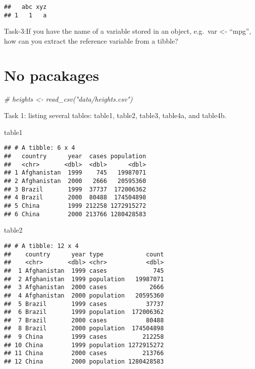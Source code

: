\documentclass[
]{article}
\newenvironment{Shaded}{\begin{snugshade}}{\end{snugshade}}
\newcommand{\CommentTok}[1]{\textcolor[rgb]{0.56,0.35,0.01}{\textit{#1}}}
\newcommand{\NormalTok}[1]{#1}
\begin{document}
\begin{verbatim}
##   abc xyz
## 1   1   a
\end{verbatim}

Task-3:If you have the name of a variable stored in an object, e.g.~var
\textless- ``mpg'', how can you extract the reference variable from a
tibble?

\hypertarget{no-pacakages}{%
\section{No pacakages}\label{no-pacakages}}

\begin{Shaded}
\begin{Highlighting}[]
\CommentTok{\# heights \textless{}{-} read\_csv("data/heights.csv")}
\end{Highlighting}
\end{Shaded}

Task 1: listing several tables: table1, table2, table3, table4a, and
table4b.

\begin{Shaded}
\begin{Highlighting}[]
\NormalTok{table1}
\end{Highlighting}
\end{Shaded}

\begin{verbatim}
## # A tibble: 6 x 4
##   country      year  cases population
##   <chr>       <dbl>  <dbl>      <dbl>
## 1 Afghanistan  1999    745   19987071
## 2 Afghanistan  2000   2666   20595360
## 3 Brazil       1999  37737  172006362
## 4 Brazil       2000  80488  174504898
## 5 China        1999 212258 1272915272
## 6 China        2000 213766 1280428583
\end{verbatim}

\begin{Shaded}
\begin{Highlighting}[]
\NormalTok{table2}
\end{Highlighting}
\end{Shaded}

\begin{verbatim}
## # A tibble: 12 x 4
##    country      year type            count
##    <chr>       <dbl> <chr>           <dbl>
##  1 Afghanistan  1999 cases             745
##  2 Afghanistan  1999 population   19987071
##  3 Afghanistan  2000 cases            2666
##  4 Afghanistan  2000 population   20595360
##  5 Brazil       1999 cases           37737
##  6 Brazil       1999 population  172006362
##  7 Brazil       2000 cases           80488
##  8 Brazil       2000 population  174504898
##  9 China        1999 cases          212258
## 10 China        1999 population 1272915272
## 11 China        2000 cases          213766
## 12 China        2000 population 1280428583
\end{verbatim}
\end{document}
